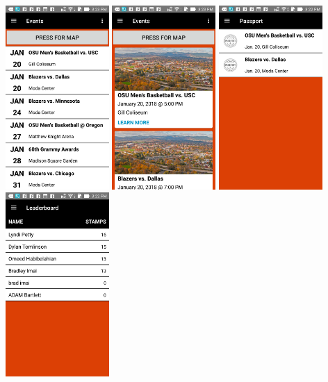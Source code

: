 \documentclass[onecolumn, draftclsnofoot,10pt, compsoc]{IEEEtran}
\begin{document}
		\includegraphics[height=7cm]{eventlistview}
		\includegraphics[height=7cm]{eventcardview}
		\includegraphics[height=7cm]{passport}
		\includegraphics[height=7cm]{leaderboard}
\end{document}
